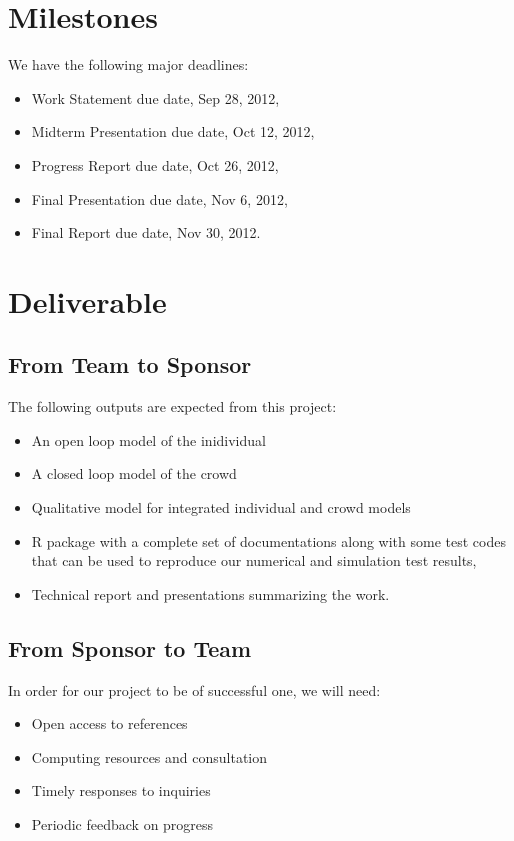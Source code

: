 \documentclass[12pt,letterpaper]{article}
\theoremstyle{definition}
\begin{document}
\section{Milestones}
We have the following major deadlines:
\begin{itemize}
    \item Work Statement due date, Sep 28, 2012,
    \item Midterm Presentation due date, Oct 12, 2012,
    \item Progress Report due date, Oct 26, 2012,
    \item Final Presentation due date, Nov 6, 2012,
    \item Final Report due date, Nov 30, 2012.
\end{itemize}

\section{Deliverable}
\subsection{From Team to Sponsor} %
The following outputs are expected from this project:
\begin{itemize}
    \item An open loop model of the inidividual
    \item A closed loop model of the crowd
    \item Qualitative model for integrated individual and crowd models
    \item R package with a complete set of documentations along with some test 
        codes that can be used to reproduce our numerical and simulation test
        results,
    \item Technical report and presentations summarizing the work. 
\end{itemize}

\subsection{From Sponsor to Team} %

In order for our project to be of successful one, we will need:
\begin{itemize}
    \item Open access to references
    \item Computing resources and consultation
    \item Timely responses to inquiries
    \item Periodic feedback on progress
\end{itemize}


\newpage

\renewcommand\bibname{Selected Bibliography Including Cited Works}
\nocite{*}

\end{document}
